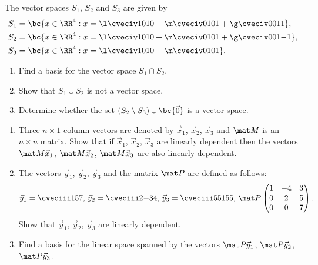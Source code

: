 \begin{problem}
    The vector spaces $S_1$, $S_2$ and $S_3$ are given by
    \begin{align*}
        S_1 &= \bc{x \in \RR^4 : x = \l \cveciv1010 + \m \cveciv0101 + \g \cveciv0011},\\
        S_2 &= \bc{x \in \RR^4 : x = \l \cveciv1010 + \m \cveciv0101 + \g \cveciv001{-1}},\\
        S_3 &= \bc{x \in \RR^4 : x = \l \cveciv1010 + \m \cveciv0101}.
    \end{align*}
    
    \begin{enumerate}
        \item Find a basis for the vector space $S_1 \cap S_2$.
        \item Show that $S_1 \cup S_2$ is not a vector space.
        \item Determine whether the set $(S_2 \setminus S_3) \cup \bc{\vec 0}$ is a vector space.
    \end{enumerate}
\end{problem}

\begin{problem}
    \begin{enumerate}
        \item Three $n \times 1$ column vectors are denoted by $\vec x_1$, $\vec x_2$, $\vec x_3$ and $\mat M$ is an $n \times n$ matrix. Show that if $\vec x_1$, $\vec x_2$, $\vec x_3$ are linearly dependent then the vectors $\mat M \vec x_1$, $\mat M \vec x_2$, $\mat M \vec x_3$ are also linearly dependent.
        \item The vectors $\vec y_1$, $\vec y_2$, $\vec y_3$ and the matrix $\mat P$ are defined as follows: \[\vec y_1 = \cveciii157, \, \vec y_2 = \cveciii2{-3}{4}, \, \vec y_3 = \cveciii5{51}{55}, \, \mat P \begin{pmatrix}1 & -4 & 3 \\ 0 & 2 & 5 \\ 0 & 0 & 7\end{pmatrix}.\] Show that $\vec y_1$, $\vec y_2$, $\vec y_3$ are linearly dependent.
        \item Find a basis for the linear space spanned by the vectors $\mat P \vec y_1$, $\mat P \vec y_2$, $\mat P \vec y_3$.
    \end{enumerate}
\end{problem}

